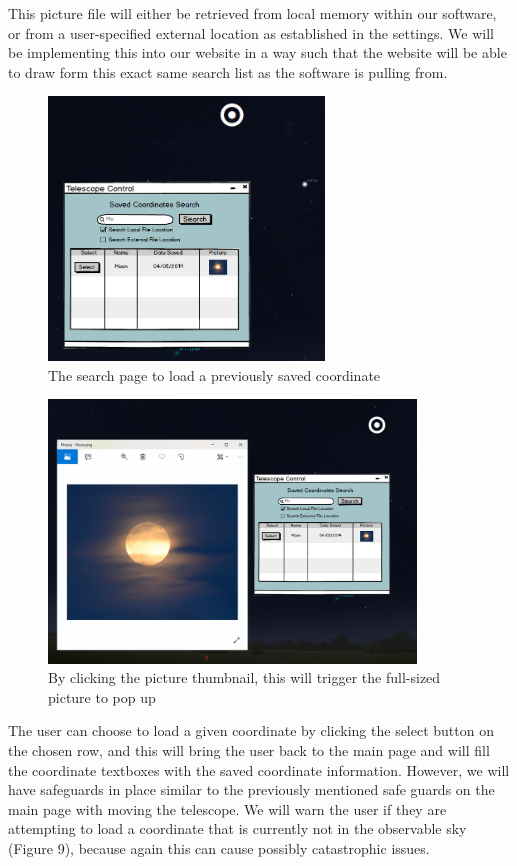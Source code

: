 \documentclass[12pt]{report}
\begin{document}
This picture file will either be retrieved from local memory within our software, or from a user-specified external location as established in the settings. We will be implementing this into our website in a way such that the website will be able to draw form this exact same search list as the software is pulling from.

\begin{figure}[h]
	\centering
	\includegraphics[width=0.55\linewidth, height=7.0cm]{SearchPage}
	\caption{The search page to load a previously saved coordinate}
\end{figure}

\newpage

\begin{figure}[h]
	\centering
	\includegraphics[width=0.65\linewidth, height=7.0cm]{SearchClickedPicture}
	\caption{By clicking the picture thumbnail, this will trigger the full-sized picture to pop up}
\end{figure}

The user can choose to load a given coordinate by clicking the select button on the chosen row, and this will bring the user back to the main page and will fill the coordinate textboxes with the saved coordinate information. However, we will have safeguards in place similar to the previously mentioned safe guards on the main page with moving the telescope. We will warn the user if they are attempting to load a coordinate that is currently not in the observable sky (Figure 9), because again this can cause possibly catastrophic issues.  
\end{document}
